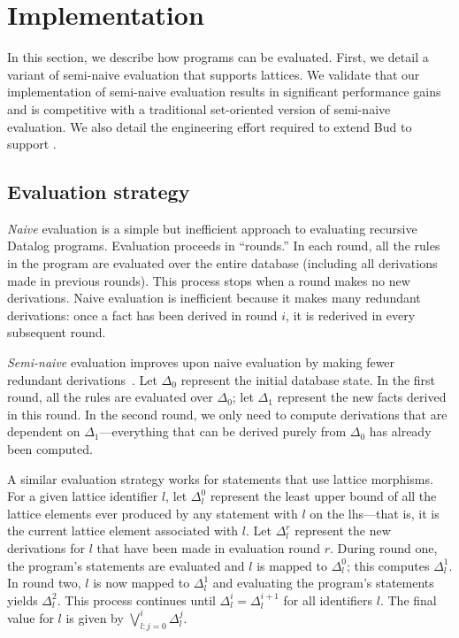 \section{Implementation}
\label{sec:impl}

In this section, we describe how \lang programs can be evaluated. First, we
detail a variant of semi-naive evaluation that supports lattices. We validate
that our implementation of semi-naive evaluation results in significant
performance gains and is competitive with a traditional set-oriented version of
semi-naive evaluation. We also detail the engineering effort required to extend
Bud to support \lang. %

\subsection{Evaluation strategy}
\label{sec:lattice-eval-strat}
\emph{Naive} evaluation is a simple but inefficient approach to evaluating
recursive Datalog programs. Evaluation proceeds in ``rounds.'' In each round, all
the rules in the program are evaluated over the entire database (including all
derivations made in previous rounds). This process stops when a round makes no
new derivations. Naive evaluation is inefficient because it makes many redundant
derivations: once a fact has been derived in round $i$, it is rederived in every
subsequent round.

\emph{Semi-naive} evaluation improves upon naive evaluation by making fewer
redundant derivations~\cite{Balbin1987}. Let $\Delta_0$ represent the initial
database state. In the first round, all the rules are evaluated over $\Delta_0$;
let $\Delta_1$ represent the new facts derived in this round. In the second
round, we only need to compute derivations that are dependent on
$\Delta_1$---everything that can be derived purely from $\Delta_0$ has already
been computed.

A similar evaluation strategy works for \lang statements that use lattice
morphisms. For a given lattice identifier $l$, 
let $\Delta_l^0$ represent the least upper bound of all the lattice
elements ever produced by any statement with $l$ on the lhs---that is, it is the
current lattice element associated with $l$. 
Let $\Delta^r_l$ represent the new
derivations for $l$ that have been made in evaluation round $r$. During round
one, the program's statements are evaluated and $l$ is mapped to $\Delta_l^0$; this
computes $\Delta^1_l$. In round two, $l$ is now mapped to $\Delta^1_l$ and
evaluating the program's statements yields $\Delta^2_l$. This process continues
until $\Delta^i_l = \Delta^{i+1}_l$ for all identifiers $l$. 
The final value for $l$ is given by $\bigvee_{l: j=0}^i \Delta^j_l$.


